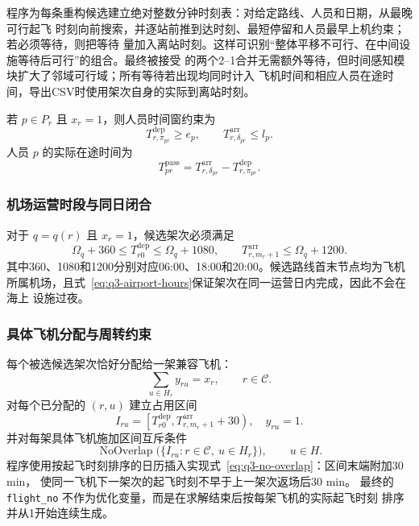 \documentclass[UTF8,a4paper,zihao=5]{ctexart}
\begin{document}
程序为每条重构候选建立绝对整数分钟时刻表：对给定路线、人员和日期，从最晚可行起飞
时刻向前搜索，并逐站前推到达时刻、最短停留和人员最早上机约束；若必须等待，则把等待
量加入离站时刻。这样可识别“整体平移不可行、在中间设施等待后可行”的组合。最终被接受
的两个2--1合并无需额外等待，但时间感知模块扩大了邻域可行域；所有等待若出现均同时计入
飞机时间和相应人员在途时间，导出CSV时使用架次自身的实际到离站时刻。

若 $p\in P_r$ 且 $x_r=1$，则人员时间窗约束为
\begin{equation}
  T_{r,\pi_{pr}}^{\mathrm{dep}}\ge e_p,
  \qquad
  T_{r,\delta_{pr}}^{\mathrm{arr}}\le l_p.
  \label{eq:q3-passenger-window}
\end{equation}
人员 $p$ 的实际在途时间为
\begin{equation}
  T_{pr}^{\mathrm{pass}}
  =T_{r,\delta_{pr}}^{\mathrm{arr}}
  -T_{r,\pi_{pr}}^{\mathrm{dep}}.
  \label{eq:q3-passenger-time}
\end{equation}

\subsubsection{机场运营时段与同日闭合}

对于 $q=q(r)$ 且 $x_r=1$，候选架次必须满足
\begin{equation}
  \Omega_q+360
  \le T_{r0}^{\mathrm{dep}}
  \le \Omega_q+1080,
  \qquad
  T_{r,m_r+1}^{\mathrm{arr}}\le\Omega_q+1200.
  \label{eq:q3-airport-hours}
\end{equation}
其中360、1080和1200分别对应06:00、18:00和20:00。候选路线首末节点均为飞机
所属机场，且式~\eqref{eq:q3-airport-hours}保证架次在同一运营日内完成，因此不会在海上
设施过夜。

\subsubsection{具体飞机分配与周转约束}

每个被选候选架次恰好分配给一架兼容飞机：
\begin{equation}
  \sum_{u\in H_r}y_{ru}=x_r,
  \qquad r\in\mathcal{C}.
  \label{eq:q3-aircraft-assignment}
\end{equation}
对每个已分配的 $(r,u)$ 建立占用区间
\begin{equation}
  I_{ru}=\left[
    T_{r0}^{\mathrm{dep}},
    T_{r,m_r+1}^{\mathrm{arr}}+30
  \right),
  \quad y_{ru}=1.
  \label{eq:q3-optional-interval}
\end{equation}
并对每架具体飞机施加区间互斥条件
\begin{equation}
  \operatorname{NoOverlap}\bigl(\{I_{ru}:r\in\mathcal{C},\ u\in H_r\}\bigr),
  \qquad u\in H.
  \label{eq:q3-no-overlap}
\end{equation}
程序使用按起飞时刻排序的日历插入实现式~\eqref{eq:q3-no-overlap}：区间末端附加30 min，
使同一飞机下一架次的起飞时刻不早于上一架次返场后30 min。
最终的 \texttt{flight\_no} 不作为优化变量，而是在求解结束后按每架飞机的实际起飞时刻
排序并从1开始连续生成。
\end{document}
